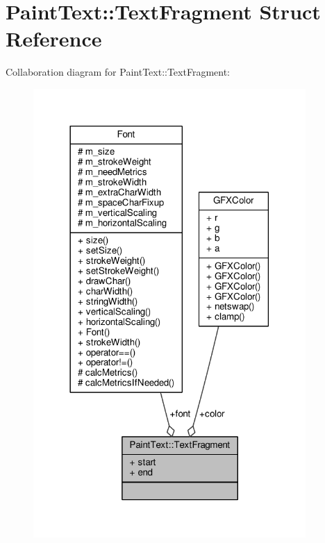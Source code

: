 \hypertarget{structPaintText_1_1TextFragment}{}\section{Paint\+Text\+:\+:Text\+Fragment Struct Reference}
\label{structPaintText_1_1TextFragment}


Collaboration diagram for Paint\+Text\+:\+:Text\+Fragment\+:
\nopagebreak
\begin{figure}[H]
\begin{center}
\leavevmode
\includegraphics[width=294pt]{df/d5c/structPaintText_1_1TextFragment__coll__graph}
\end{center}
\end{figure}

